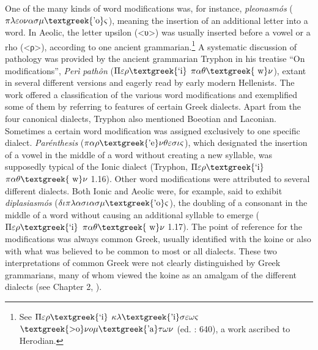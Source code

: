 \begin{styleCatalogusnotities}
One of the many kinds of word modifications was, for instance, \textit{pleonasmós} ($\pi \lambda \varepsilon o\nu \alpha \sigma \mu \text{\textgreek{'o}}\varsigma $), meaning the insertion of an additional letter into a word. In Aeolic, the letter upsilon (<υ>) was usually inserted before a vowel or a rho (<ρ>), according to one ancient grammarian.\footnote{ \textrm{See $\Pi \varepsilon \rho \text{\textgreek{`i}}$ $\kappa \lambda \text{\textgreek{'i}}\sigma \varepsilon \omega \varsigma $ $\text{\textgreek{>o}}\nu o\mu \text{\textgreek{'a}}\tau \omega \nu $ (ed. \citealt{Lentz1870}: 640), a work ascribed to Herodian.}} A systematic discussion of pathology was provided by the ancient grammarian Tryphon in his treatise “On modifications”, \textit{Perì} \textit{pathôn} ($\Pi \varepsilon \rho \text{\textgreek{`i}}$ $\pi \alpha \theta \text{\textgreek{~w}}\nu $), extant in several different versions and eagerly read by early modern Hellenists. The work offered a classification of the various word modifications and exemplified some of them by referring to features of certain Greek dialects. Apart from the four canonical dialects, Tryphon also mentioned Boeotian and Laconian. Sometimes a certain word modification was assigned exclusively to one specific dialect. \textit{Parénthesis} ($\pi \alpha \rho \text{\textgreek{'e}}\nu \theta \varepsilon \sigma \iota \varsigma $), which designated the insertion of a vowel in the middle of a word without creating a new syllable, was supposedly typical of the Ionic dialect (Tryphon, $\Pi \varepsilon \rho \text{\textgreek{`i}}$ $\pi \alpha \theta \text{\textgreek{~w}}\nu $ 1.16). Other word modifications were attributed to several different dialects. Both Ionic and Aeolic were, for example, said to exhibit \textit{diplasiasmós} ($\delta \iota \pi \lambda \alpha \sigma \iota \alpha \sigma \mu \text{\textgreek{'o}}\varsigma $), the doubling of a consonant in the middle of a word without causing an additional syllable to emerge ($\Pi \varepsilon \rho \text{\textgreek{`i}}$ $\pi \alpha \theta \text{\textgreek{~w}}\nu $ 1.17). The point of reference for the modifications was always common Greek, usually identified with the koine or also with what was believed to be common to most or all dialects. These two interpretations of common Greek were not clearly distinguished by Greek grammarians, many of whom viewed the koine as an amalgam of the different dialects (see Chapter 2, ).
\end{styleCatalogusnotities}

